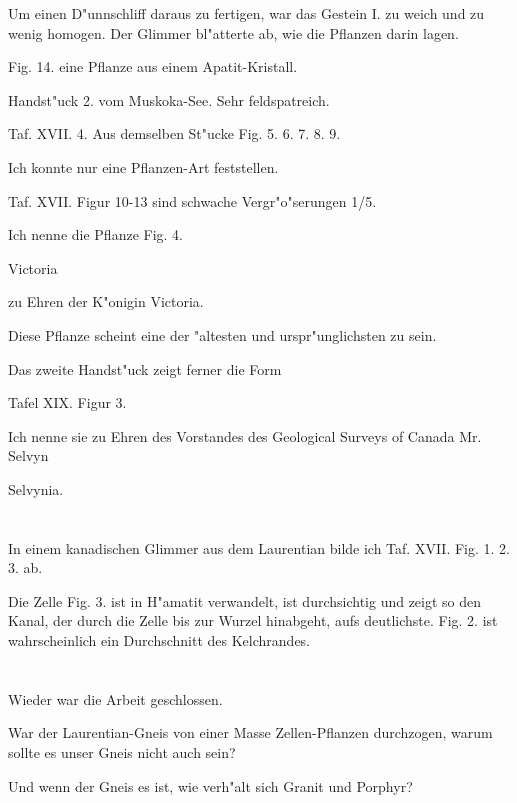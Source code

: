 \documentclass[a4paper, 11pt, oneside, german]{article}
\begin{document}
Um einen D"unnschliff daraus zu fertigen, war das Gestein I. zu weich und zu wenig homogen. Der Glimmer bl"atterte ab, wie die Pflanzen darin lagen.

Fig. 14. eine Pflanze aus einem Apatit-Kristall.

Handst"uck 2. vom Muskoka-See. Sehr feldspatreich.

Taf. XVII. 4. Aus demselben St"ucke Fig. 5. 6. 7. 8. 9.

Ich konnte nur eine Pflanzen-Art feststellen.

Taf. XVII. Figur 10-13 sind schwache Vergr"o"serungen 1/5.

Ich nenne die Pflanze Fig. 4.

Victoria

zu Ehren der K"onigin Victoria.

Diese Pflanze scheint eine der "altesten und urspr"unglichsten zu sein.

Das zweite Handst"uck zeigt ferner die Form

Tafel XIX. Figur 3.

Ich nenne sie zu Ehren des Vorstandes des Geological Surveys of Canada Mr. Selvyn

Selvynia.
\clearpage
\section{}
\paragraph{}
In einem kanadischen Glimmer aus dem Laurentian bilde ich Taf. XVII. Fig. 1. 2. 3. ab.

Die Zelle Fig. 3. ist in H"amatit verwandelt, ist durchsichtig und zeigt so den Kanal, der durch die Zelle bis zur Wurzel hinabgeht, aufs deutlichste. Fig. 2. ist wahrscheinlich ein Durchschnitt des Kelchrandes.
\clearpage
\section{}
\paragraph{}
Wieder war die Arbeit geschlossen.

War der Laurentian-Gneis von einer Masse Zellen-Pflanzen durchzogen, warum sollte es unser Gneis nicht auch sein?

Und wenn der Gneis es ist, wie verh"alt sich Granit und Porphyr?
\end{document}
